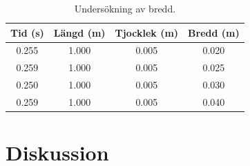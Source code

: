 \documentclass[10pt, titlepage, oneside, a4paper]{article}
\begin{document}
    \begin{table}
        \caption{Undersökning av bredd.}
        \begin{center}
            \begin{tabular}{cccc}
                \hline
                Tid (s) & Längd (m) & Tjocklek (m) & Bredd (m)\\
                \hline
                0.255 & 1.000 & 0.005 & 0.020\\
                0.259 & 1.000 & 0.005 & 0.025\\
                0.250 & 1.000 & 0.005 & 0.030\\
                0.259 & 1.000 & 0.005 & 0.040\\
            \end{tabular}
        \end{center}
    \end{table}

    \section{Diskussion}
\end{document}
